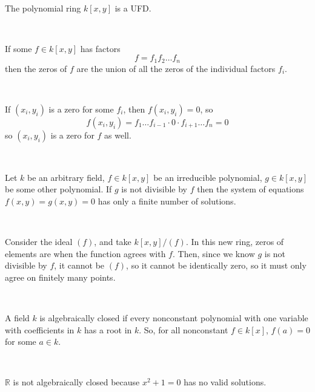 \documentclass{article}
\begin{document}
\begin{example}
	\

	The polynomial ring $k[x,y]$ is a UFD.
\end{example}

\begin{proposition}
	\

	If some $f \in k[x,y]$ has factors $$f = f_1 f_2 \dots f_n$$then the zeros of $f$ are the union of all the zeros of the individual factors $f_i$.
\end{proposition}

\begin{customproof}
	\

	If $(x_i, y_i)$ is a zero for some $f_i$, then $f(x_i,y_i) = 0$, so $$f(x_i, y_i) = f_1 \dots f_{i-1} \cdot 0 \cdot f_{i+1} \dots f_n = 0$$so $(x_i, y_i)$ is a zero for $f$ as well.
\end{customproof}

\begin{lemma}
	\

	Let $k$ be an arbitrary field, $f \in k[x,y]$ be an irreducible polynomial, $g \in k[x,y]$ be some other polynomial. If $g$ is not divisible by $f$ then the system of equations $f(x,y) = g(x,y) = 0$ has only a finite number of solutions.
\end{lemma}

\begin{customproof}
	\

	Consider the ideal $(f)$, and take $k[x,y]/(f)$. In this new ring, zeros of elements are when the function agrees with $f$. Then, since we know $g$ is not divisible by $f$, it cannot be $(f)$, so it cannot be identically zero, so it must only agree on finitely many points.
\end{customproof}

\begin{definition}
	\

	A field $k$ is algebraically closed if every nonconstant polynomial with one variable with coefficients in $k$ has a root in $k$. So, for all nonconstant $f \in k[x]$, $f(a) = 0$ for some $a \in k$.
\end{definition}

\begin{example}
	\

	$\mathbb{R}$ is not algebraically closed because $x^2 + 1 = 0$ has no valid solutions.
\end{example}
\end{document}
